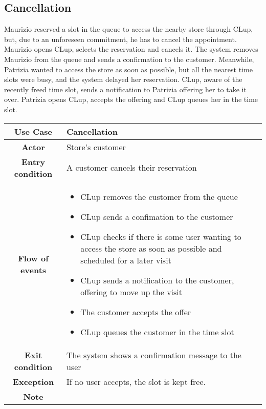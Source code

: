 \documentclass[../../main.tex]{subfiles}
\begin{document}
    \subsection*{Cancellation}

    Maurizio reserved a slot in the queue to access the nearby store through CLup, but, due to an unforeseen commitment, 
    he has to cancel the appointment. Maurizio opens CLup, selects the reservation and cancels it. 
    The system removes Maurizio from the queue and sends a confirmation to the customer. 
    Meanwhile, Patrizia wanted to access the store as soon as possible, but all the nearest time slots were busy, 
    and the system delayed her reservation. CLup, aware of the recently freed time slot, sends a notification to Patrizia offering her to take it over. 
    Patrizia opens CLup, accepts the offering and CLup queues her in the time slot.

    \begin{table}[H]
      \centering
        \begin{tabular}{c m{}}
        \hline
        \textbf{Use Case} & Cancellation\\ \hline
        \textbf{Actor} & Store's customer\\ \hline
        \textbf{Entry condition} & A customer cancels their reservation\\  \hline
        \textbf{Flow of events} & \begin{itemize}
                                    \item CLup removes the customer from the queue
                                    \item CLup sends a confimation to the customer
                                    \item CLup checks if there is some user wanting to access the store as soon as possible and scheduled for a later visit
                                    \item CLup sends a notification to the customer, offering to move up the visit
                                    \item The customer accepts the offer
                                    \item CLup queues the customer in the time slot
                                  \end{itemize}\\ \hline
        \textbf{Exit condition} & The system shows a confirmation message to the user \\ \hline
        \textbf{Exception} & If no user accepts, the slot is kept free. \\ \hline
        \textbf{Note} &\\ \hline
        \end{tabular}
    \end{table}



        
\end{document}
